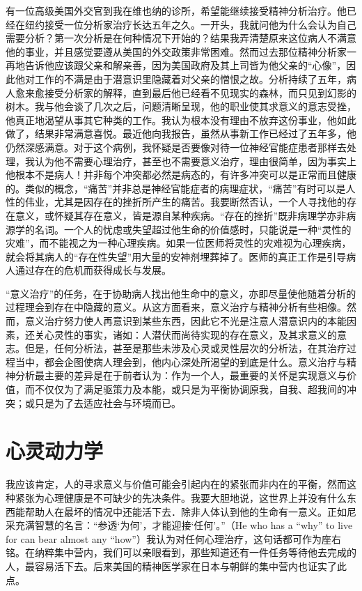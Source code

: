 \documentclass[11pt,oneside]{book}
\begin{document}
\begin{common-format}
有一位高级美国外交官到我在维也纳的诊所，希望能继续接受精神分析治疗。他已经在纽约接受一位分析家治疗长达五年之久。一开头，我就问他为什么会认为自己需要分析？第一次分析是在何种情况下开始的？结果我弄清楚原来这位病人不满意他的事业，并且感觉要遵从美国的外交政策非常困难。然而过去那位精神分析家一再地告诉他应该跟父亲和解亲善，因为美国政府及其上司皆为他父亲的“心像”，因此他对工作的不满是由于潜意识里隐藏着对父亲的憎恨之故。分析持续了五年，病人愈来愈接受分析家的解释，直到最后他已经看不见现实的森林，而只见到幻影的树木。我与他会谈了几次之后，问题清晰呈现，他的职业使其求意义的意志受挫，他真正地渴望从事其它种类的工作。我认为根本没有理由不放弃这份事业，他如此做了，结果非常满意喜悦。最近他向我报告，虽然从事新工作已经过了五年多，他仍然深感满意。对于这个病例，我怀疑是否要像对待一位神经官能症患者那样去处理，我认为他不需要心理治疗，甚至也不需要意义治疗，理由很简单，因为事实上他根本不是病人！并非每个冲突都必然是病态的，有许多冲突可以是正常而且健康的。类似的概念，“痛苦”并非总是神经官能症者的病理症状，“痛苦”有时可以是人性的伟业，尤其是因存在的挫折所产生的痛苦。我要断然否认，一个人寻找他的存在意义，或怀疑其存在意义，皆是源自某种疾病。“存在的挫折”既非病理学亦非病源学的名词。一个人的忧虑或失望超过他生命的价值感时，只能说是一种“灵性的灾难”，而不能视之为一种心理疾病。如果一位医师将灵性的灾难视为心理疾病，就会将其病人的“存在性失望”用大量的安神剂埋葬掉了。医师的真正工作是引导病人通过存在的危机而获得成长与发展。

“意义治疗”的任务，在于协助病人找出他生命中的意义，亦即尽量使他随着分析的过程理会到存在中隐藏的意义。从这方面看来，意义治疗与精神分析有些相像。然而，意义治疗努力使人再意识到某些东西，因此它不光是注意人潜意识内的本能因素，还关心灵性的事实，诸如：人潜伏而尚待实现的存在意义，及其求意义的意志。但是，任何分析法，甚至是那些未涉及心灵或灵性层次的分析法，在其治疗过程当中，都会企图使病人理会到，他内心深处所渴望的到底是什么。意义治疗与精神分析最主要的差异是在于前者认为：作为一个人，最重要的关怀是实现意义与价值，而不仅仅为了满足驱策力及本能，或只是为平衡协调原我，自我、超我间的冲突；或只是为了去适应社会与环境而已。


\section{心灵动力学}
我应该肯定，人的寻求意义与价值可能会引起内在的紧张而非内在的平衡，然而这种紧张为心理健康是不可缺少的先决条件。我要大胆地说，这世界上并没有什么东西能帮助人在最坏的情况中还能活下去．除非人体认到他的生命有一意义。正如尼采充满智慧的名言：“参透‘为何’，才能迎接‘任何’。”（He who has a “why” to live for can bear almost any “how”）我认为对任何心理治疗，这句话都可作为座右铭。在纳粹集中营内，我们可以亲眼看到，那些知道还有一件任务等待他去完成的人，最容易活下去。后来美国的精神医学家在日本与朝鲜的集中营内也证实了此点。


\end{common-format}
\end{document}

